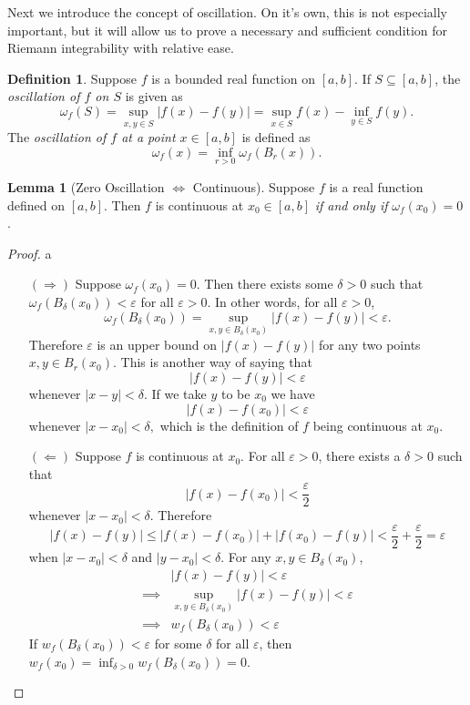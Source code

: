 \documentclass{article}
\newcommand{\abs}[1]{\left\lvert#1\right\rvert}
\theoremstyle{definition}
\newtheorem{lemma}{Lemma}[section]
\newtheorem{definition}{Definition}[section]
\begin{document}
	Next we introduce the concept of oscillation. On it's own, this is not especially important, but it will allow us to prove a necessary and sufficient condition for Riemann integrability with relative ease.
	\begin{definition}\label{def6.13}
		Suppose $ f $ is a bounded real function on $ [a,b] $. If $ S\subseteq [a,b] $, the \textit{\color{red}oscillation of $ f $ on $ S $} is given as 
		$$ \omega_f(S)= \sup_{x,y\in S}\abs{f(x)-f(y)} = \sup_{x\in S} f(x) - \inf_{y\in S}f(y).$$ The \textit{\color{red}oscillation of $ f $ at a point $ x\in [a,b] $} is defined as 
		$$ \omega_f(x)=\inf_{r > 0}\omega_f\left(B_r(x)\right) .$$
	\end{definition} 
	\begin{lemma}[Zero Oscillation $ \iff $ Continuous]
		Suppose $ f $ is a real function defined on $ [a,b] $. Then $ f $ is continuous at $ x_0\in [a,b] $ \textit{if and only if} $ \omega_f(x_0)=0 $.
	\end{lemma} 
	\begin{proof}
		{\color{white}a}
		\begin{enumerate}
			\item [$ (\Longrightarrow) $] Suppose $ \omega_f(x_0)=0 $. Then there exists some $ \delta >0 $ such that $\omega_f(B_\delta(x_0))<\varepsilon $ for all $ \varepsilon > 0 $. In other words, for all $ \varepsilon >0 $, 
			$$ \omega_f(B_\delta(x_0)) = \sup_{x,y\in B_\delta(x_0)}\abs{f(x)-f(y)} <\varepsilon .$$ Therefore $ \varepsilon $ is an upper bound on $ \abs{f(x)-f(y)} $ for any two points $ {x,y\in B_r(x_0)} $. This is another way of saying that $$ \abs{f(x)-f(y)} <\varepsilon $$ whenever $ \abs{x-y}<\delta $. If we take $ y $ to be $ x_0 $ we have $$ \abs{f(x)-f(x_0)} <\varepsilon $$ whenever $ \abs{x-x_0}<\delta ,$ which is the definition of $ f $ being continuous at $ x_0 $. 
			\item [$ (\Longleftarrow) $] Suppose $ f $ is continuous at $ x_0 $. For all $ \varepsilon >0 $, there exists a $ \delta>0 $ such that 
			$$ \abs{f(x)-f(x_0)} <\frac{\varepsilon}{2} $$  whenever $  \abs{x-x_0}<\delta $. Therefore 
			$$ \abs{f(x)-f(y)} \le \abs{f(x)-f(x_0)} + \abs{f(x_0)-f(y)} < \frac{\varepsilon}{2} + \frac{\varepsilon}{2} = \varepsilon$$ when
			$\abs{x-x_0}<\delta $ and $ \abs{y-x_0}<\delta $. 
			For any $x,y\in B_\delta(x_0) $, 
			\begin{align*}
				&\abs{f(x)-f(y)} < \varepsilon \\
				\implies & \sup_{x,y\in B_\delta(x_0)}\abs{f(x)-f(y)} <\varepsilon \\ \implies & w_f(B_\delta(x_0))<\varepsilon 
			\end{align*}
			If $ w_f(B_\delta(x_0))<\varepsilon  $ for some $ \delta $ for all $ \varepsilon $, then $ w_f(x_0)=\inf_{\delta > 0}w_f(B_\delta(x_0))=0 $. 
		\end{enumerate}
	\end{proof}
\end{document}
